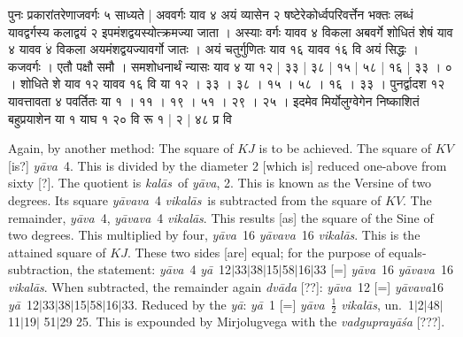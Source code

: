 \documentclass[11pt,a5paper]{book}
\def\kalas{\textit{ka\-l\=as}}
\def\ya{\textit{y\=a}}
\def\yava{\textit{y\=ava}}
\def\yavava{\textit{y\=avava}}
\def\vikalas{\textit{vi\-ka\-l\=as}}
\def\danda{$|$}
\begin{document}
\iffalse 
\begin{center}
\texttt{[image: 9v.png]}
\captionof{figure}{9v}
\end{center}
\fi 


\newpage
{\s पुनः प्रकारांतरेणाजवर्गः ५ साध्यते | अववर्गः याव ४
अयं व्यासेन २ षष्टेरेकोर्ध्वपरिवर्त्तेन भक्तः लब्धं
यावद्वर्गस्य कलाद्वयं २ इपमंशद्वयस्योत्क्रमज्या जाता । अस्याः वर्गः यावव ४
विकला अबवर्गे शोधितं शेषं याव ४ यावव $\dot{४}$ विकला अयमंशद्वयज्यावर्गो
जातः । अयं चतुर्गुणितः याव १६ यावव $\dot{१६}$ वि अयं
सिद्धः । कजवर्गः । एतौ पक्षौ समौ । समशोधनार्थं न्यासः याव ४ या १२ |
३३ | ३८ | १५ | ५८ | १६ | ३३ । ० । 
शोधिते शे याव १२  यावव १६  वि या १२ । ३३ । ३८ । १५ । ५८ । १६ । ३३ ।  
पुनर्द्वादश १२ यावत्तावता ४ पवर्तितः या १ । ११ । १९ । ५१ । २९ । २५ ।
इदमेव मिर्योलुग्वेगेन निष्काशितं बहुप्रयाशेन
या १ याघ १ २० वि रू १ | २ | ४८ प्र वि }
\newpage

Again, by another method: The square of $KJ$ is to be achieved. The square of $KV$
[is?] \yava\ 4. This is divided by the diameter 2 [which is] reduced one-above from sixty [?].
The quotient is \kalas\ of \yava, 2. This is known as the Versine of two degrees. 
Its square \yavava\ 4 \vikalas\ is subtracted from the square of $KV$. The remainder, 
\yava\ 4, \yavava\ 4 \vikalas.  This results [as] the square of the Sine of two degrees.
This 
multiplied by four, \yava\ 16 \yavava\ 16 \vikalas. This is the attained square of $KJ$. 
These two sides [are] equal; for the purpose of equals-subtraction, the statement:
\yava\ 4 \ya\ 12\danda 33\danda 38\danda 15\danda 58\danda 16\danda 33 
[=]
\yava\ 16 \yavava\ 16 \vikalas. When subtracted, the remainder again \textit{dv\=ada} [??]:
\yava\ 12 [=] \yavava 16 \ya\ 12\danda 33\danda 38\danda 15\danda 58\danda 16\danda 33.
Reduced by the \ya: 
\ya\ 1 [=] \yava\ $\frac{1}{2}$ \vikalas, un.\ 1\danda 2\danda 48\danda 11\danda 19\danda
51\danda 29 25. 
This is expounded by Mirjolugvega with the \textit{vadgupray\=a\'sa} [???]. 
\end{document}
